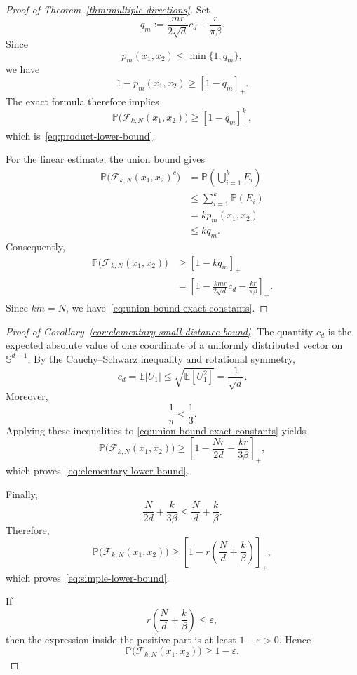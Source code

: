 \begin{proof}[Proof of Theorem~\ref{thm:multiple-directions}]
Set
\[
    q_m
    :=
    \frac{mr}{2\sqrt{d}}c_d
    +
    \frac{r}{\pi\beta}.
\]
Since
\[
    p_m(x_1,x_2)\leq\min\{1,q_m\},
\]
we have
\[
    1-p_m(x_1,x_2)
    \geq
    [1-q_m]_+.
\]
The exact formula therefore implies
\[
    \mathbb{P}\bigl(\mathcal{F}_{k,N}(x_1,x_2)\bigr)
    \geq
    [1-q_m]_+^k,
\]
which is~\eqref{eq:product-lower-bound}.

For the linear estimate, the union bound gives
\begin{align}
    \mathbb{P}
    \bigl(
        \mathcal{F}_{k,N}(x_1,x_2)^c
    \bigr)
    &=
    \mathbb{P}
    \left(
        \bigcup_{i=1}^k E_i
    \right)
    \nonumber\\
    &\leq
    \sum_{i=1}^k\mathbb{P}(E_i)
    \nonumber\\
    &=
    kp_m(x_1,x_2)
    \nonumber\\
    &\leq
    kq_m.
    \label{eq:multiple-direction-union-bound}
\end{align}
Consequently,
\begin{align}
    \mathbb{P}\bigl(\mathcal{F}_{k,N}(x_1,x_2)\bigr)
    &\geq
    [1-kq_m]_+
    \nonumber\\
    &=
    \left[
        1-
        \frac{kmr}{2\sqrt{d}}c_d
        -
        \frac{kr}{\pi\beta}
    \right]_+.
    \label{eq:union-before-N}
\end{align}
Since $km=N$, we have~\eqref{eq:union-bound-exact-constants}.
\end{proof}


\begin{proof}[Proof of Corollary~\ref{cor:elementary-small-distance-bound}]
The quantity $c_d$ is the expected absolute value of one coordinate
of a uniformly distributed vector on $\mathbb{S}^{d-1}$. By the
Cauchy--Schwarz inequality and rotational symmetry,
\begin{equation}
    c_d
    =
    \mathbb{E}|U_1|
    \leq
    \sqrt{\mathbb{E}[U_1^2]}
    =
    \frac{1}{\sqrt{d}}.
    \label{eq:cd-elementary-bound}
\end{equation}
Moreover,
\[
    \frac{1}{\pi}<\frac{1}{3}.
\]
Applying these inequalities to
\eqref{eq:union-bound-exact-constants} yields
\[
    \mathbb{P}\bigl(\mathcal{F}_{k,N}(x_1,x_2)\bigr)
    \geq
    \left[
        1-
        \frac{Nr}{2d}
        -
        \frac{kr}{3\beta}
    \right]_+,
\]
which proves~\eqref{eq:elementary-lower-bound}.

Finally,
\[
    \frac{N}{2d}+\frac{k}{3\beta}
    \leq
    \frac{N}{d}+\frac{k}{\beta}.
\]
Therefore,
\[
    \mathbb{P}\bigl(\mathcal{F}_{k,N}(x_1,x_2)\bigr)
    \geq
    \left[
        1-
        r\left(
            \frac{N}{d}
            +
            \frac{k}{\beta}
        \right)
    \right]_+,
\]
which proves~\eqref{eq:simple-lower-bound}.

If
\[
    r
    \left(
        \frac{N}{d}
        +
        \frac{k}{\beta}
    \right)
    \leq
    \varepsilon,
\]
then the expression inside the positive part is at least
$1-\varepsilon>0$. Hence
\[
    \mathbb{P}\bigl(\mathcal{F}_{k,N}(x_1,x_2)\bigr)
    \geq
    1-\varepsilon.
\]
\end{proof}



